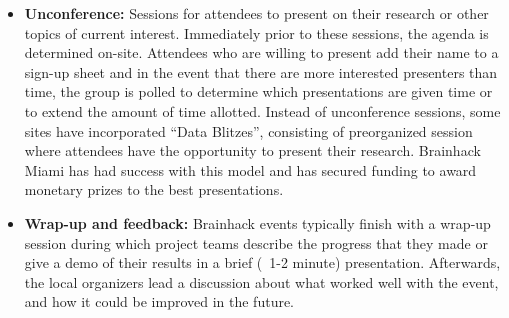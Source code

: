 \documentclass[11pt]{bmc_article_s50}
\begin{document}
\begin{table}[!ht]
\begin{itemize}
    \item
        \textbf{Unconference:} Sessions for attendees to present on their research or other topics of current interest. Immediately prior to these sessions, the agenda is determined on-site. Attendees who are willing to present add their name to a sign-up sheet and in the event that there are more interested presenters than time, the group is polled to determine which presentations are given time or to extend the amount of time allotted. Instead of unconference sessions, some sites have incorporated ``Data Blitzes'', consisting of preorganized session where attendees have the opportunity to present their research. Brainhack Miami has had success with this model and has secured funding to award monetary prizes to the best presentations.
    \item
        \textbf{Wrap-up and feedback:} Brainhack events typically finish with a wrap-up session during which project teams describe the progress that they made or give a demo of their results in a brief (~1-2 minute) presentation. Afterwards, the local organizers lead a discussion about what worked well with the event, and how it could be improved in the future.
    \end{itemize}
\hline
\end{table}

  

\end{document}
